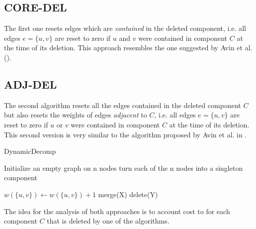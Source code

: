 \documentclass[a4paper,xcolor=dvipsnames, tikz, 12pt]{article}
\newcommand{\opt}{\text{O{\scriptsize PT}}}
\theoremstyle{definition}
\begin{document}
	\subsection{CORE-DEL}
	
	 The first one resets edges which are \textit{contained} in the deleted component, i.e. all edges $e=\{u,v\}$ are reset to zero if $u$ and $v$ were contained in component $C$ at the time of its deletion. This approach resembles the one suggested by Avin et al. (\cite{Avin2015a}).
	 
	 \subsection{ADJ-DEL}
	
	The second algorithm resets all the edges contained in the deleted component $C$ but also resets the weights of edges \textit{adjacent} to $C$, i.e. all edges $e=\{u,v\}$ are reset to zero if $u$ or $v$ were contained in component $C$ at the time of its deletion. This second version is very similar to the algorithm proposed by Avin et al. in \cite{Avin2015}.
	
	
	\begin{algorithm}
		\caption{DynamicDecomp}
		\label{highLevelAlg}
		\begin{algorithmic}
			\STATE Initialize an empty graph on n nodes
			\STATE turn each of the n nodes into a singleton component
			
			\STATE $w(\{u,v\})\gets w(\{u,v\})+1$
			\ENDIF
			\STATE merge(X)
			\ENDIF
			\STATE delete(Y)
			\ENDIF	
			
			\ENDFOR
			
		\end{algorithmic}
	\end{algorithm}
	
	The idea for the analysis of both approaches is to account cost to \opt{} for each component $C$ that is deleted by one of the algorithms.
	
\end{document}
